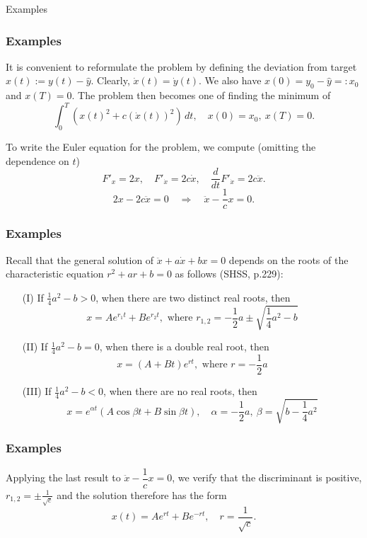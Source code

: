 \documentclass[10pt]{beamer}
\theoremstyle{definition}
\begin{document}
\begin{section}{Examples}
\begin{frame}[fragile]
\frametitle{Examples}\addtocounter{theorem}{-1}
\begin{example}[cont.]
It is convenient to reformulate the problem by defining the deviation from target $ x(t):= y(t)-\hat{y} $. Clearly, $ \dot{x}(t) = \dot{y}(t) $. We also have $ x(0)=y_0-\hat{y} =: x_0 $ and $ x(T) = 0 $. The problem then becomes one of finding the minimum of 
\[ \int_{0}^{T}\left( x(t)^2 + c (\dot{x}(t))^2 \right)\,dt, \quad x(0)=x_0,~x(T)=0. \]\bigskip

To write the Euler equation for the problem, we compute (omitting the dependence on $ t $) \[ F'_x = 2x,\quad F'_{\dot{x}} = 2c\dot{x},\quad \frac{d}{dt}F'_{\dot{x}}=2c\ddot{x}. \] \[ 2x - 2c\ddot{x} = 0 \quad\Rightarrow\quad \ddot{x} - \dfrac{1}{c}x = 0. \]
\end{example}
\end{frame}

\begin{frame}[fragile]
\frametitle{Examples}\addtocounter{theorem}{-1}
\begin{example}[cont.]
Recall that the general solution of $ \ddot{x}+a\dot{x}+bx=0 $ depends on the roots of the characteristic equation $ r^2+ar+b=0 $ as follows (SHSS, p.229):
\begin{itemize}
\item[(I)] If $ \frac{1}{4}a^2-b>0 $, when there are two distinct real roots, then \[ x=Ae^{r_1t}+B e^{r_2t}, \text{ where } r_{1,2}=-\frac{1}{2}a\pm \sqrt{\frac{1}{4}a^2 - b} \]
\item[(II)] If $ \frac{1}{4}a^2-b=0 $, when there is a double real root, then
\[ x = (A+Bt)e^{rt},\text{ where } r=-\dfrac{1}{2}a \]
\item[(III)] If $ \frac{1}{4}a^2-b<0 $, when there are no real roots, then 
\[ x=e^{\alpha t}(A \cos \beta t + B \sin \beta t), \quad \alpha = -\dfrac{1}{2}a,~\beta =  \sqrt{b-\dfrac{1}{4}a^2}\]
\end{itemize}
\end{example}
\end{frame}

\begin{frame}[fragile]
\frametitle{Examples}\addtocounter{theorem}{-1}
\begin{example}[cont.]
Applying the last result to $ \ddot{x} - \dfrac{1}{c}x = 0 $, we verify that the discriminant is positive, $ r_{1,2}=\pm\frac{1}{\sqrt{c}} $ and the solution therefore has the form \[ x(t)=A e^{rt}+B e^{-rt},\quad r=\frac{1}{\sqrt{c}}. \]


\end{example}
\end{frame}
\end{section}
\end{document}
